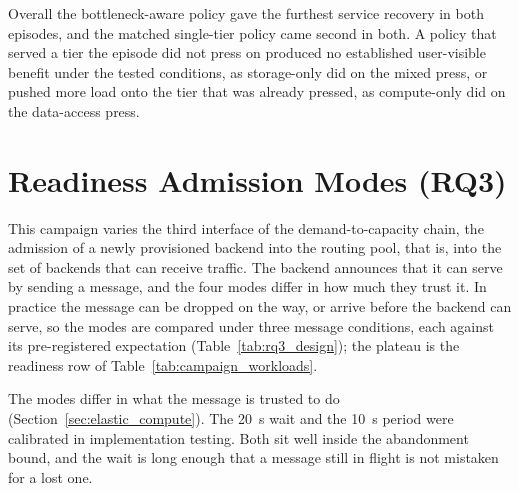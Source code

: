 ﻿\documentclass[12pt,reqno,twoside]{amsbook}
\begin{document}
Overall the bottleneck-aware policy gave the furthest service recovery in both
episodes, and the matched single-tier policy came second in both. A policy that
served a tier the episode did not press on produced no established user-visible
benefit under the tested conditions, as storage-only did on the mixed press, or
pushed more load onto the
tier that was already pressed, as compute-only did on the data-access press.

\section{Readiness Admission Modes (RQ3)}\label{sec:results_rq3_readiness}

This campaign varies the third interface of the demand-to-capacity chain, the
admission of a newly provisioned backend into the routing pool, that is, into
the set of backends that can receive traffic. The backend announces that it can
serve by sending a message, and the four modes differ in how much they trust it. In
practice the message can be dropped on the way, or arrive before the
backend can serve, so the modes are compared under three message
conditions, each against its pre-registered expectation
(Table~\ref{tab:rq3_design}); the plateau is the readiness row of
Table~\ref{tab:campaign_workloads}.

The modes differ in what the message is trusted to do
(Section~\ref{sec:elastic_compute}). The 20~s wait and the 10~s period were
calibrated in
implementation testing. Both sit well inside the abandonment bound, and
the wait is long enough that a message still in flight is not mistaken
for a lost one.
\end{document}
